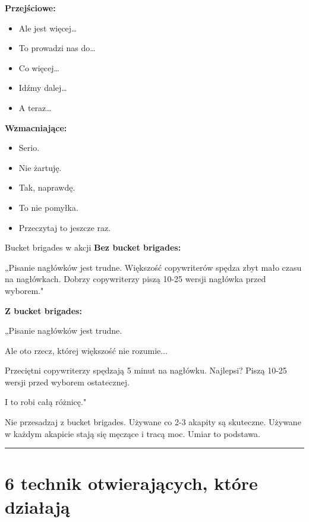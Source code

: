 \documentclass[
  12pt,
  a4paper,
  twoside,
  openright,
  12pt,
  DIV=12,
  BCOR=12mm]{scrbook}
\providecommand{\tightlist}{%
  \setlength{\itemsep}{0pt}\setlength{\parskip}{0pt}}\usepackage{longtable,booktabs,array}
\newcommand{\decoline}{%
  \begin{center}
    \textcolor{bordergray}{\rule{0.3\textwidth}{0.5pt}}
  \end{center}
}
\begin{document}
\textbf{Przejściowe:}

\begin{itemize}
\tightlist
\item
  Ale jest więcej\ldots{}
\item
  To prowadzi nas do\ldots{}
\item
  Co więcej\ldots{}
\item
  Idźmy dalej\ldots{}
\item
  A teraz\ldots{}
\end{itemize}

\textbf{Wzmacniające:}

\begin{itemize}
\tightlist
\item
  Serio.
\item
  Nie żartuję.
\item
  Tak, naprawdę.
\item
  To nie pomyłka.
\item
  Przeczytaj to jeszcze raz.
\end{itemize}

\begin{przyklad}{Bucket brigades w akcji}
\textbf{Bez bucket brigades:}

„Pisanie nagłówków jest trudne. Większość copywriterów spędza zbyt mało czasu na nagłówkach. Dobrzy copywriterzy piszą 10-25 wersji nagłówka przed wyborem."

\textbf{Z bucket brigades:}

„Pisanie nagłówków jest trudne.

Ale oto rzecz, której większość nie rozumie...

Przeciętni copywriterzy spędzają 5 minut na nagłówku. Najlepsi? Piszą 10-25 wersji przed wyborem ostatecznej.

I to robi całą różnicę."
\end{przyklad}

\begin{uwaga}
Nie przesadzaj z bucket brigades. Używane co 2-3 akapity są skuteczne. Używane w każdym akapicie stają się męczące i tracą moc. Umiar to podstawa.
\end{uwaga}

\decoline

\section{6 technik otwierających, które
działają}\label{technik-otwierajux105cych-ktuxf3re-dziaux142ajux105}
\end{document}
